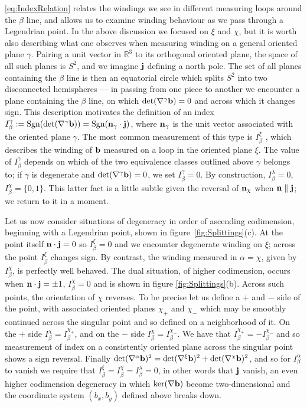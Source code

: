 { \eqref{eq:IndexRelation} relates the windings we see in different measuring loops around the $\beta$ line, and allows us to examine winding behaviour as we pass through a Legendrian point. In the above discussion we focused on $\xi$ and $\chi$, but it is worth also describing what one observes when measuring winding on a general oriented plane $\gamma$. Pairing a unit vector in $\mathbb{R}^3$ to its orthogonal oriented plane, the space of all such planes is $S^2$, and we imagine $\mathbf{j} $ defining a north pole. The set of all planes containing the $\beta$ line is then an equatorial circle which splits $S^2$ into two disconnected hemispheres --- in passing from one piece to another we encounter a plane containing the $\beta$ line, on which $\mathrm{det}(\nabla^\gamma \mathbf{b}) = 0$ and across which it changes sign. This description motivates the definition of an index $ I^\gamma_\beta := \mathrm{Sgn}(\mathrm{det}(\nabla^\gamma \mathbf{b})) =\mathrm{Sgn}(\mathbf{n}_\gamma \cdot \mathbf{j})$, where $\mathbf{n}_\gamma$ is the unit vector associated with the oriented plane $\gamma$. The most common measurement of this type is $I^\xi_\beta$ \citep{Nye1987,Berry1998,Berry2004}, which describes the winding of $\mathbf{b}$ measured on a loop in the oriented plane $\xi$. The value of $I^\gamma_\beta$ depends on which of the two equivalence classes outlined above $\gamma$ belongs to; if $\gamma$ is degenerate and $\mathrm{det}(\nabla^\gamma \mathbf{b})=0$, we set $I^\gamma_\beta=0$. By construction, $I^\lambda_\beta=0$, $I^\chi_\beta= \{0,1\}$. This latter fact is a little subtle given the reversal of $\mathbf{n}_\chi$ when $\mathbf{n} \parallel \mathbf{j}$; we return to it in a moment.  

 Let us now consider situations of degeneracy in order of ascending codimension, beginning with a Legendrian point, shown in figure~\ref{fig:Splittings}(c). At the point itself $\mathbf{n} \cdot \mathbf{j} =0$ so $I^\xi_\beta=0$ and we encounter degenerate winding on $\xi$; across the point $I^\xi_\beta$ changes sign. By contrast, the winding measured in $\alpha = \chi$, given by $I^{\chi}_\beta$, is perfectly well behaved. The dual situation, of higher codimension, occurs when $\mathbf{n} \cdot \mathbf{j} = \pm 1$, $I^\chi_\beta=0$ and is shown in figure \ref{fig:Splittings}(b). Across such points, the orientation of $\chi$ reverses. To be precise let us define a $+$ and $-$ side of the point, with associated oriented planes $\chi_+$ and $\chi_-$ which may be smoothly continued across the singular point and so defined on a neighborhood of it. On the $+$ side $I^\chi_\beta = I_\beta^{\chi_+}$, and on the $-$ side $I_{\beta}^\chi = I_{\beta}^{\chi_-}$. We have that $I_{\beta}^{\chi_+} = -I_{\beta}^{\chi_-}$ and so measurement of index on a consistently oriented plane across the singular point shows a sign reversal. Finally $\mathrm{det}(\nabla^{\alpha}\mathbf{b})^2 = \mathrm{det}(\nabla^\xi \mathbf{b})^2+ \mathrm{det}(\nabla^\chi \mathbf{b})^2$, and so for $I^{\mathrm{\alpha}}_\beta$ to vanish we require that $I^\xi_\beta = I^\chi_\beta = I^\lambda_\beta=0$, in other words that $\mathbf{j}$ vanish, an even higher codimension degeneracy in which $\mathrm{ker}(\nabla \mathbf{b})$ become two-dimensional and the coordinate system $(b_x,b_y)$ defined above breaks down. 

}
